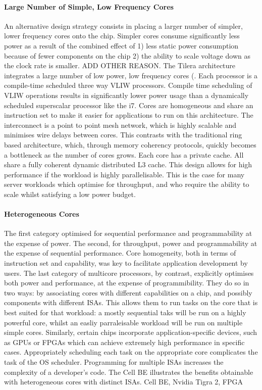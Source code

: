 \paragraph{Large Number of Simple, Low Frequency Cores} An alternative
design strategy consists in placing a larger number of simpler, lower frequency cores
onto the chip. Simpler cores consume significantly less power as
a result of the combined effect of 1) less static power consumption because 
of fewer components on the chip 2) the ability to scale voltage down as
the clock rate is smaller. ADD OTHER REASON. The Tilera
architecture integrates a large number of low power, low frequency 
cores (. Each processor is a compile-time scheduled three way VLIW processors.
Compile time scheduling of VLIW operations results in significantly
lower power usage than a dynamically scheduled superscalar
processor like the i7. Cores are homogeneous and share 
an instruction set to make it easier for applications to run on
this architecture.  The interconnect is a point to point mesh network, which
is highly scalable and minimises wire delays between cores. This
contrasts with the traditional ring based architecture, which,
through memory coherency protocols, quickly becomes a bottleneck
as the number of cores grows. Each
core has a private cache. All share a fully coherent dynamic
distributed L3 cache.  This design allows for high performance
if the workload is highly parallelisable. This is the case for many 
server workloads which optimise for throughput, and who require
the ability to scale whilst satisfying a low power budget.  

\paragraph{Heterogeneous Cores} The first category optimised for 
sequential performance and programmability at the expense of power. The second, 
for throughput, power and programmability at the expense of sequential performance. 
Core homogeneity, both in terms of instruction set and capability,
was key to facilitate application development by users. The last category
of multicore processors, by contrast, explicitly optimises both
power and performance, at the expense of programmibility. They do so in two ways: 
by associating cores with different capabilities on a chip, and possibly components
with different ISAs. This allows them to run tasks on the core
that is best suited for that workload: a mostly sequential taks will be run 
on a highly powerful core, whilst an easliy parraleisable workload
will be run on multiple simple cores. Similarly, certain chips incorporate
application-specific devices, such as GPUs or FPGAs which can achieve extremely
high performance in specific cases. Appropriately scheduling each 
task on the appropriate core complicates the task of the OS scheduler.
Programming for multiple ISAs increases the complexity of a developer's code. 
The Cell BE illustrates the benefits obtainable with heterogeneous
cores with distinct ISAs. 
Cell BE, Nvidia Tigra 2, FPGA

